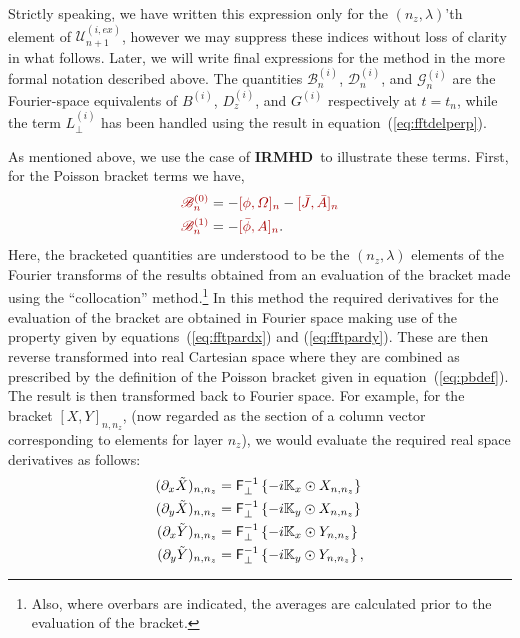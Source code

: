 \documentclass[12pt]{memoir}
\newcommand{\irmhd}{\textbf{IRMHD}}
\newcommand{\fftperp}{\mathsf{F}_\perp}
\newcommand{\bfield}{\mathscr{B}}
\newcommand{\dfield}{\mathscr{D}}
\newcommand{\gfield}{\mathscr{G}}
\newcommand{\ufield}{\mathscr{U}}
\begin{document}
%
Strictly speaking, we have written this expression only for the
$(n_z, \lambda)$'th element of $\ufield_{n+1}^{(i,ex)}$, however
we may suppress these indices without loss of clarity in what 
follows. Later, we will write final expressions for the method
in the more formal notation described above.
The quantities 
{\color{red!65!black}$\bfield^{(i)}_{n}$},
{\color{blue!65!black}$\dfield^{(i)}_n$}, 
and 
{\color{green!65!black}$\gfield^{(i)}_n$} 
are the Fourier-space equivalents of
{\color{red!65!black}$B^{(i)}$},
{\color{blue!65!black}$D_z^{(i)}$}, and 
{\color{green!65!black}$G^{(i)}$} 
respectively at $t=t_n$, while the term 
{\color{orange}$L^{(i)}_\perp$} has 
been handled using the result in equation~(\ref{eq:fftdelperp}).
%
\par
%
As mentioned above, we use the case of \irmhd\ to illustrate
these terms. First, for the Poisson bracket terms we have,
%
\begin{subequations}
\begin{align}
  {\color{red!65!black}\bfield^{(0)}_n} &= -{\color{red!65!black}[\phi,\Omega]_n} - {\color{red!65!black}[\bar J,\bar A]_n} \label{eq:bdefa} \\
  {\color{red!65!black}\bfield^{(1)}_n} &= -{\color{red!65!black}[\bar\phi,A]_n}.                                           \label{eq:bdefb}
\end{align}
\end{subequations}
%
Here, the bracketed quantities are understood to be the
$(n_z,\lambda)$ elements of the Fourier transforms of
the results obtained from an evaluation of the bracket
made using the ``collocation'' method.\footnote{Also,
where overbars are indicated, the averages are calculated
prior to the evaluation of the bracket.} In this method
the required derivatives for the evaluation of the
bracket are obtained in Fourier space making use of the
property given by equations~(\ref{eq:fftpardx}) and
(\ref{eq:fftpardy}). These are then reverse transformed
into real Cartesian space where they are combined as
prescribed by the definition of the Poisson bracket given
in equation~(\ref{eq:pbdef}). The result is then transformed
back to Fourier space.  For example, for the bracket
{\color{red!65!black}$[X,Y]_{n,n_z}$}, (now regarded as
the section of a column vector corresponding to elements
for layer $n_z$), we would evaluate the required real
space derivatives as follows:
%
\begin{subequations}
\begin{align}
  (\pardx \tilde X)_{n,n_z} &= \fftperp^{-1}\left\{ -i\mathbb{K}_{x} \odot X_{n,n_z}\right\} \\
  (\pardy \tilde X)_{n,n_z} &= \fftperp^{-1}\left\{ -i\mathbb{K}_{y} \odot X_{n,n_z}\right\} \\
  (\pardx \tilde Y)_{n,n_z} &= \fftperp^{-1}\left\{ -i\mathbb{K}_{x} \odot Y_{n,n_z}\right\} \\
  (\pardy \tilde Y)_{n,n_z} &= \fftperp^{-1}\left\{ -i\mathbb{K}_{y} \odot Y_{n,n_z}\right\},
\end{align}
\end{subequations}
\end{document}
